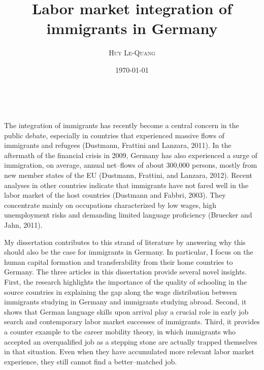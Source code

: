 \documentclass[a4paper, 11pt]{article} %
\title{\textbf{Labor market integration of immigrants in Germany}}
\author{\textsc{Huy Le-Quang}}%
\date{\today} %
\makeatletter
\renewcommand{\maketitle}{ %
\begin{center} %
{\LARGE\@title} %

\vspace{15pt} %

{\large\@author} %
\\\@date %

\vspace{12pt} %
\end{center}
}
\makeatother
\begin{document}
\maketitle %





The integration of immigrants has recently become a central concern in the public debate, especially in countries that experienced massive flows of immigrants and refugees (Dustmann, Frattini and Lanzara, 2011). In the aftermath of the financial crisis in 2009, Germany has also experienced a surge of immigration, on average, annual net--flows of about 300,000 persons, mostly from new member states of the EU (Dustmann, Frattini, and Lanzara, 2012). Recent analyses in other countries indicate that immigrants have not fared well in the labor market of the host countries (Dustmann and Fabbri, 2003). They concentrate mainly on occupations characterized by low wages, high unemployment risks and demanding limited language proficiency (Bruecker and Jahn, 2011).

My dissertation contributes to this strand of literature by answering why this should also be the case for immigrants in Germany. In particular, I focus on the human capital formation and transferability from their home countries to Germany. The three articles in this dissertation provide several novel insights. First, the research highlights the importance of the quality of schooling in the source countries in explaining the gap along the wage distribution between immigrants studying in Germany and immigrants studying abroad. Second, it shows that German language skills upon arrival play a crucial role in early job search and contemporary labor market successes of immigrants. Third, it provides a counter example to the career mobility theory, in which immigrants who accepted an overqualified job as a stepping stone are actually trapped themselves in that situation. Even when they have accumulated more relevant labor market experience, they still cannot find a better--matched job.
\end{document}
